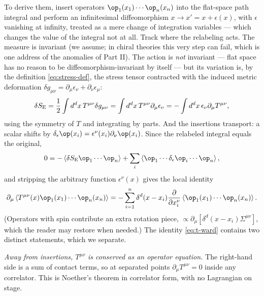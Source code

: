 To derive them, insert operators $\op_1(x_1)\cdots\op_n(x_n)$ into the flat-space path
integral and perform an infinitesimal diffeomorphism $x \to x' = x +
\epsilon(x)$, with $\epsilon$ vanishing at infinity, treated as a mere change
of integration variables --- which changes the value of the integral not at
all. Track where the relabeling acts. The measure is invariant (we assume; in
chiral theories this very step can fail, which is one address of the
anomalies of Part II). The action is \emph{not} invariant --- flat space has
no reason to be diffeomorphism-invariant by itself --- but its variation is,
by the definition \eqref{eq:stress-def}, the stress tensor contracted with
the induced metric deformation $\delta g_{\mu\nu} = \partial_\mu
\epsilon_\nu + \partial_\nu \epsilon_\mu$:
\begin{equation}
\delta S_{\rm E}
= \frac12 \int d^dx\, T^{\mu\nu} \delta g_{\mu\nu}
= \int d^dx\, T^{\mu\nu} \partial_\mu \epsilon_\nu
= -\int d^dx\, \epsilon_\nu \partial_\mu T^{\mu\nu} ,
\end{equation}
using the symmetry of $T$ and integrating by parts. And the insertions
transport: a scalar shifts by $\delta_\epsilon \op(x_i) =
\epsilon^\nu(x_i) \partial_\nu \op(x_i)$. Since the relabeled integral
equals the original,
\begin{equation}
0 = -\left\langle \delta S_{\rm E} \op_1 \cdots \op_n\right\rangle
+ \sum_i \left\langle \op_1 \cdots \delta_\epsilon \op_i \cdots
\op_n\right\rangle ,
\end{equation}
and stripping the arbitrary function $\epsilon^\nu(x)$
gives the local identity
\begin{equation}
\partial_\mu \left\langle T^{\mu\nu}(x) \op_1(x_1)\cdots\op_n(x_n)
\right\rangle
= -\sum_{i=1}^n \delta^d(x - x_i)
\frac{\partial}{\partial x_i^{\nu}}
\left\langle \op_1(x_1) \cdots \op_n(x_n)\right\rangle .
\label{eq:t-ward}
\end{equation}
(Operators with spin contribute an extra rotation piece, $\propto
\partial_\mu[\delta^d(x - x_i) \Sigma^{\mu\nu}]$, which the reader may
restore when needed.) The identity \eqref{eq:t-ward} contains two distinct
statements, which we separate.

\emph{Away from insertions, $T^{\mu\nu}$ is conserved as an operator
equation.} The right-hand side is a sum of contact terms, so at separated
points $\partial_\mu T^{\mu\nu} = 0$ inside any correlator. This is Noether's
theorem in correlator form, with no Lagrangian on stage.

